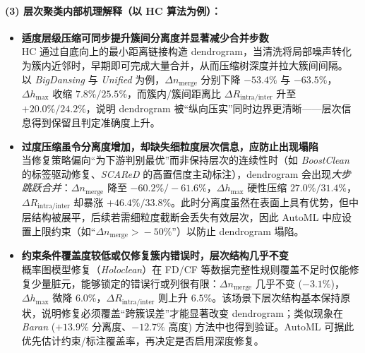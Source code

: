 \documentclass[10pt]{article} %
\numberwithin{equation}{section}
\begin{document}
\paragraph{(3) 层次聚类内部机理解释（以 HC 算法为例）：}
\label{sec:hierarch_by_conclusion}
\vspace{-0.25em}

\begin{itemize}[leftmargin=1.6em,itemsep=4pt]
  \item \textbf{适度层级压缩可同步提升簇间分离度并显著减少合并步数}  \\
        HC 通过自底向上的最小距离链接构造 dendrogram，\textcolor[rgb]{0.00,0.07,1.00}{当清洗将局部噪声转化为簇内近邻时，早期即可完成大量合并，从而压缩树深度并拉大簇间间隔。} 以 \textit{BigDansing} 与 \textit{Unified} 为例，$\Delta n_{\text{merge}}$ 分别下降 \(-53.4\%\) 与 \(-63.5\%\)，$\Delta h_{\max}$ 收缩 \(7.8\%\!/\!25.5\%\)，而簇内/簇间距离比 $\Delta R_{\text{intra/inter}}$ 升至 \(+20.0\%\!/\!24.2\%\)，\textcolor[rgb]{0.00,0.07,1.00}{说明 dendrogram 被“纵向压实”同时边界更清晰——层次信息得到保留且判定准确度上升。}

  \item \textbf{过度压缩虽令分离度增加，却缺失细粒度层次信息，应防止出现塌陷}  \\
        当修复策略偏向“为下游判别最优”而非保持层次的连续性时（如 \textit{BoostClean} 的标签驱动修复、\textit{SCAReD} 的高置信度主动标注），dendrogram 会出现\emph{大步跳跃合并}：$\Delta n_{\text{merge}}$ 降至 \(-60.2\%\!/\!-61.6\%\)，$\Delta h_{\max}$ 硬性压缩 \(27.0\%\!/\!31.4\%\)，$ \Delta R_{\text{intra/inter}}$ 却暴涨 \(+46.4\%\!/\!33.8\%\)。\textcolor[rgb]{0.00,0.07,1.00}{此时分离度虽然在表面上具有优势，但中层结构被展平，后续若需细粒度截断会丢失有效层次，因此 AutoML 中应设置上限约束（如“$\Delta n_{\text{merge}} >\!-50\%$”）以防止 dendrogram 塌陷。}

  \item \textbf{约束条件覆盖度较低或仅修复簇内错误时，层次结构几乎不变} \\
        概率图模型修复（\textit{Holoclean}）在 FD/CF 等数据完整性规则覆盖不足时仅能修复少量脏元，能够锁定的错误行或列很有限：$\Delta n_{\text{merge}}$ 几乎不变 (\(-3.1\%\))，$\Delta h_{\max}$ 微降 \(6.0\%\)，$ \Delta R_{\text{intra/inter}}$ 则上升 \(6.5\%\)。\textcolor[rgb]{0.00,0.07,1.00}{该场景下层次结构基本保持原状，说明修复必须覆盖“跨簇误差”才能显著改变 dendrogram}；类似现象在 \textit{Baran} (\(+13.9\%\) 分离度、\(-12.7\%\) 高度) 方法中也得到验证。\textcolor[rgb]{0.00,0.07,1.00}{AutoML 可据此优先估计约束/标注覆盖率，再决定是否启用深度修复。}

\end{itemize}
\end{document}
